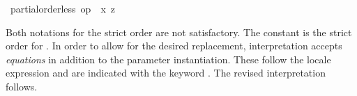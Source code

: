 \begin{isabellebody}
\begin{isamarkuptext}
\begin{isabelle}
\isaindent{\ \ }{\isasymLongrightarrow}\ partial{\isacharunderscore}order{\isachardot}less\ op\ {\isasymle}\ {\isacharquery}x\ {\isacharquery}z%
\end{isabelle}
  Both notations for the strict order are not satisfactory.  The
  constant  is the strict order for .
  In order to allow for the desired replacement, interpretation
  accepts \emph{equations} in addition to the parameter instantiation.
  These follow the locale expression and are indicated with the
  keyword .  The revised interpretation follows.%
\end{isamarkuptext}%
\isamarkuptrue%
%
\isadelimtheory
%
\endisadelimtheory
%
\isatagtheory
{}\isamarkupfalse%
%
\endisatagtheory
{\isafoldtheory}%
%
\isadelimtheory
%
\endisadelimtheory
\isanewline
\end{isabellebody}%

